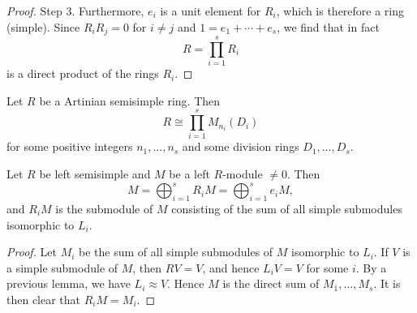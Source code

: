 \begin{theorem}
\begin{proof}
        Step 3. Furthermore, $e_i$ is a unit element for $R_i$, which is therefore a ring (simple). Since $R_i R_j=0$ for $i \neq j$ and $1=e_1+\cdots+e_s$, we find that in fact \begin{equation*}
            R=\prod_{i=1}^s R_i
        \end{equation*}
        is a direct product of the rings $R_i$.
    \end{proof}
\end{theorem}

\begin{corollary}
    Let $R$ be a Artinian semisimple ring. Then
    \begin{equation*}
        R \cong \prod_{i=1}^s M_{n_i}\left(D_i\right)
    \end{equation*}
    for some positive integers $n_1, \ldots, n_s$ and some division rings $D_1, \ldots, D_s$.
\end{corollary}



\begin{theorem}
    Let $R$ be left semisimple and $M$ be a left $R$-module $\neq 0$. Then
    \begin{equation*}
        M=\bigoplus_{i=1}^s R_i M=\bigoplus_{i=1}^s e_i M,
    \end{equation*}
    and $R_i M$ is the submodule of $M$ consisting of the sum of all simple submodules isomorphic to $L_i$.
    \begin{proof}
        Let $M_i$ be the sum of all simple submodules of $M$ isomorphic to $L_i$.
        If $V$ is a simple submodule of $M$, then $R V=V$, and hence $L_i V=V$ for some $i$. By a previous lemma, we have $L_i \approx V$. Hence $M$ is the direct sum of $M_1, \ldots, M_s$. It is then clear that $R_i M=M_i$.
    \end{proof}
\end{theorem}




